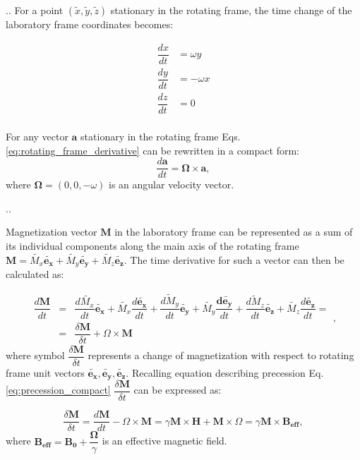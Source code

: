 \documentclass[handout]{beamer}
\begin{document}
\begin{frame}{\thesection.\thesubsection. \insertsubsection}For a point $(\tilde{x},\tilde{y},\tilde{z})$ stationary in the rotating frame, the time change of the laboratory frame coordinates becomes:
 
 \begin{equation} \label{eq:rotating_frame_derivative}
 \begin{array}{lcl}
 \dfrac{dx}{dt} &= \omega {y}  \\
 \dfrac{dy}{dt} &= -\omega {x}  \\
 \dfrac{dz}{dt} &= 0  \\
 \end{array}
 \end{equation} 
 
 For any vector $\bm{a}$ stationary in the rotating frame Eqs.\ref{eq:rotating_frame_derivative} can be rewritten in a compact form:
 \begin{equation}
 \dfrac{d\bm{a}}{dt} = \bm{\Omega} \times \bm{a},
 \end{equation}
 where $\bm{\Omega} = (0,0, -\omega)$ is an angular velocity vector.


\end{frame}
\begin{frame}[shrink=5]{\thesection.\thesubsection. \insertsubsection}

 Magnetization vector $\bm{M}$ in the laboratory frame can be represented as a sum of its individual components along the main axis of the rotating frame $\bm{M} = \tilde{M_x} \bm{\tilde{e_x}} + \tilde{M_y} \bm{\tilde{e_y}}+ \tilde{M_z} \bm{\tilde{e_z}}$.  The time derivative for such a vector can then be calculated as:
 
 \begin{equation}
 \begin{array} {lcl}
 \dfrac{d\bm{M}}{dt} &=& \dfrac{d\tilde{M_x}}{dt} \bm{\tilde{e_x}} + \tilde{M_x} \dfrac{d\bm{\tilde{e_x}}}{dt} + \dfrac{\tilde{dM_y}}{dt} \bm{\tilde{e_y}} + \tilde{M_y} \dfrac{\bm{d\tilde{e_y}}}{dt} + \dfrac{\tilde{dM_z}}{dt} \bm{\tilde{e_z}} + \tilde{M_z} \dfrac{d\bm{\tilde{e_z}}}{dt} = \\
 &=& \dfrac{\delta \bm{M}}{\delta t} + \Omega \times \bm{M}
 \end{array},
 \end{equation}
 where symbol $\dfrac{\delta \bm{M}}{\delta t}$ represents a change of magnetization with respect to rotating frame unit vectors $\bm{\tilde{e_x}}, \bm{\tilde{e_y}}, \bm{\tilde{e_z}}$. Recalling equation describing precession  Eq.\ref{eq:precession_compact}  $\dfrac{\delta \bm{M}}{\delta t}$ can be expressed as:

 \begin{equation}
 \dfrac{\delta \bm{M}}{\delta t} = \dfrac{d\bm{M}}{dt} - \Omega \times \bm{M} = \gamma \bm{M} \times \bm{H} + \bm{M} \times \Omega = \gamma \bm{M} \times \bm{B_{eff}},
 \end{equation}
 where  $\bm {B_{eff}} = \bm{B_0} + \dfrac{\bm {\Omega}}{\gamma}$ is an effective magnetic field. 


\end{frame}
\end{document}
